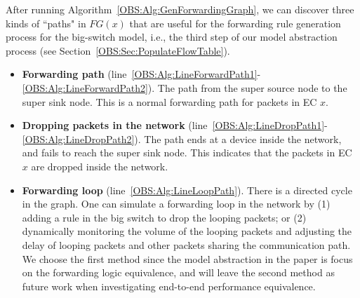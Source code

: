 After running Algorithm~\ref{OBS:Alg:GenForwardingGraph}, we can discover three kinds of ``paths" in $FG(x)$
that are useful for the forwarding rule generation process for the big-switch model,
i.e., the third step of our model abstraction process (see Section~\ref{OBS:Sec:PopulateFlowTable}).

\begin{itemize}
    \item \textbf{Forwarding path} (line~\ref{OBS:Alg:LineForwardPath1}-\ref{OBS:Alg:LineForwardPath2}).
        The path from the super source node to the super sink node.
        This is a normal forwarding path for packets in EC $x$.

    \item \textbf{Dropping packets in the network} (line~\ref{OBS:Alg:LineDropPath1}-\ref{OBS:Alg:LineDropPath2}).
        The path ends at a device inside the network, and fails to reach the super sink node. This indicates that the packets in EC $x$ are dropped inside the network.

    \item \textbf{Forwarding loop} (line~\ref{OBS:Alg:LineLoopPath}).
        There is a directed cycle in the graph. One can simulate a forwarding loop in the network by (1) adding a rule in the big switch to drop the looping packets; or (2) dynamically monitoring the volume of the looping packets and adjusting the delay of looping packets and other packets sharing the communication path. We choose the first method since the model abstraction in the paper is focus on the forwarding logic equivalence, and will leave the second method as future work when investigating end-to-end performance equivalence.
\end{itemize}

